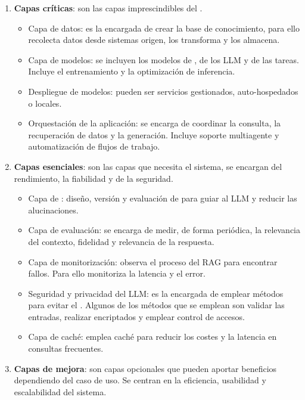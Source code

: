 \begin{enumerate}
\tightlist
	\item \textbf{Capas críticas}: son las capas imprescindibles del .
	\begin{itemize}
	\tightlist
		\item Capa de datos: es la encargada de crear la base de conocimiento, para ello recolecta datos desde sistemas origen, los transforma y los almacena.
		\item Capa de modelos: se incluyen los modelos de , de los LLM y de las tareas. Incluye el entrenamiento y la optimización de inferencia.
		\item Despliegue de modelos: pueden ser servicios gestionados, auto-hospedados o locales.
		\item Orquestación de la aplicación: se encarga de coordinar la consulta, la recuperación de datos y la generación. Incluye soporte multiagente y automatización de flujos de trabajo. 
	\end{itemize}
	\item \textbf{Capas esenciales}: son las capas que necesita el sistema, se encargan del rendimiento, la fiabilidad y de la seguridad.
	\begin{itemize}
	\tightlist
		\item Capa de : diseño, versión y evaluación de  para guiar al LLM y reducir las alucinaciones. 
		\item Capa de evaluación: se encarga de medir, de forma periódica, la relevancia del contexto, fidelidad y relevancia de la respuesta.
		\item Capa de monitorización: observa el proceso del RAG para encontrar fallos. Para ello monitoriza la latencia y el error.
		\item Seguridad y privacidad del LLM: es la encargada de emplear métodos para evitar el . Algunos de los métodos que se emplean son validar las entradas, realizar encriptados y emplear control de accesos.
		\item Capa de caché: emplea caché para reducir los costes y la latencia en consultas frecuentes.
	\end{itemize}
	\item \textbf{Capas de mejora}: son capas opcionales que pueden aportar beneficios dependiendo del caso de uso. Se centran en la eficiencia, usabilidad y escalabilidad del sistema.
\end{enumerate}

